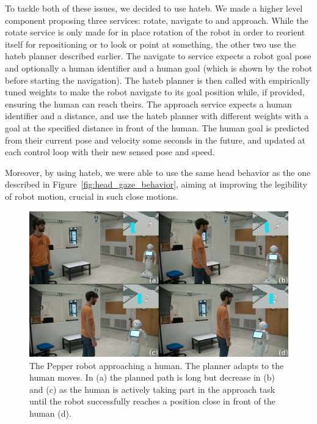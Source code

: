 \documentclass[a4paper,11pt,twoside]{StyleThese}
\begin{document}
To tackle both of these issues, we decided to use \acrshort{hateb}. We made a higher level component proposing three services: rotate, navigate to and approach. While the rotate service is only made for in place rotation of the robot in order to reorient itself for repositioning or to look or point at something, the other two use the \acrshort{hateb} planner described earlier. The navigate to service expects a robot goal pose and optionally a human identifier and a human goal (which is shown by the robot before starting the navigation). The \acrshort{hateb} planner is then called with empirically tuned weights to make the robot navigate to its goal position while, if provided, ensuring the human can reach theirs. The approach service expects a human identifier and a distance, and use the \acrshort{hateb} planner with different weights with a goal at the specified distance in front of the human. The human goal is predicted from their current pose and velocity some seconds in the future, and updated at each control loop with their new sensed pose and speed.

Moreover, by using \acrshort{hateb}, we were able to use the same head behavior as the one described in Figure~\ref{fig:head_gaze_behavior}, aiming at improving the legibility of robot motion, crucial in such close motions.

\begin{figure}[hbtp]
\centering
\includegraphics[width=\textwidth]{figures/chapter2/approach.png}
\caption{The Pepper robot approaching a human. The planner adapts to the human moves. In (a) the planned path is long but decrease in (b) and (c) as the human is actively taking part in the approach task until the robot successfully reaches a position close in front of the human (d).}
\label{fig:approach}
\end{figure}
\end{document}
